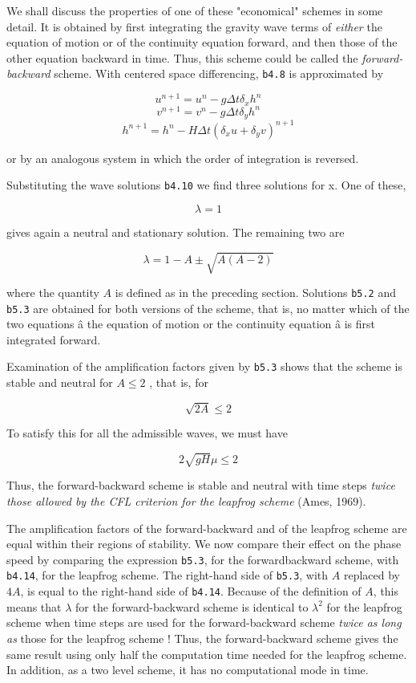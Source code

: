We shall discuss the properties of one of these "economical" schemes in
some detail. It is obtained by first integrating the gravity wave terms
of \emph{either} the equation of motion or of the continuity equation
forward, and then those of the other equation backward in time. Thus,
this scheme could be called the \emph{forward-backward} scheme. With
centered space differencing, \texttt{b4.8} is approximated by

\[u^{n + 1} = u^{n} - g\Delta t\delta_{x}h^{n}\]\[v^{n + 1} = v^{n} - g\Delta t\delta_{y}h^{n}\]\[h^{n + 1} = h^{n} - H\Delta t\left( \delta_{x}u + \delta_{y}v \right)^{n + 1}\]

or by an analogous system in which the order of integration is
reversed.

Substituting the wave solutions \texttt{b4.10} we find three solutions
for x. One of these,

\[\lambda = 1\]

gives again a neutral and stationary solution. The remaining two are

\[\lambda = 1 - A \pm \sqrt{A\left( A - 2 \right)}\]

where the quantity \(A\) is defined as in the preceding section.
Solutions \texttt{b5.2} and \texttt{b5.3} are obtained for both versions
of the scheme, that is, no matter which of the two equations â the
equation of motion or the continuity equation â is first integrated
forward.

Examination of the amplification factors given by \texttt{b5.3} shows
that the scheme is stable and neutral for \(  A \leq 2\) , that is, for

\[\sqrt{2A} \leq 2\]

To satisfy this for all the admissible waves, we must have

\[2\sqrt{gH} \mu \leq 2\]

Thus, the forward-backward scheme is stable and neutral with time steps
\emph{twice those allowed by the CFL criterion for the leapfrog scheme}
(Ames, 1969).

The amplification factors of the forward-backward and of the leapfrog
scheme are equal within their regions of stability. We now compare their
effect on the phase speed by comparing the expression \texttt{b5.3}, for
the forwardbackward scheme, with \texttt{b4.14}, for the leapfrog
scheme. The right-hand side of \texttt{b5.3}, with \(A\) replaced by
\(4A\), is equal to the right-hand side of \texttt{b4.14}. Because of
the definition of \(A\), this means that \(\lambda\) for the
forward-backward scheme is identical to \(\lambda^{2}\) for the
leapfrog scheme when time steps are used for the forward-backward scheme
\emph{twice as long as} those for the leapfrog scheme ! Thus, the
forward-backward scheme gives the same result using only half the
computation time needed for the leapfrog scheme. In addition, as a two
level scheme, it has no computational mode in time.

